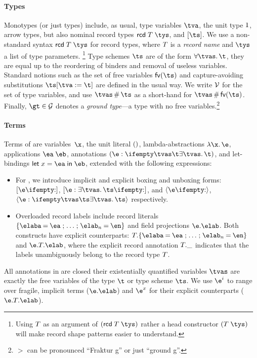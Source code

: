 \documentclass[acmsmall,screen,nonacm%
\Anonymous{,anonymous}{}%
\Final{}{,review}%
]{acmart}
\begin{document}
\paragraph{Types}

Monotypes (or just types) include, as usual, type variables $\tv$, the unit
type $1$, arrow types, but also nominal record types $\trcd \T \tys$, and
\polytypes $\tpoly \ts$. We use a non-standard syntax $\trcd \T \tys$ for record
types, where $T$ is a \emph{record name} and $\tys$ a list of type
parameters.%
%
\footnote{
  Using $T$ as an argument of $(\trcd \T \tys)$ rather a
  head constructor $(\Fapp[\T] \tys)$ will make record
  shape patterns easier to understand.
}
%
Type schemes $\ts$ are of the form $\all \tvs \t$, they are equal up to the
reordering of binders and removal of useless variables. Standard notions such
as the set of free variables $\fvs \ts$ and capture-avoiding substitutions
$\ts\where{\tv \is \t}$ are defined in the usual way. We write $\mathcal{V}$ for
the set of type variables, and use $\tvs \disjoint \ts$ as a short-hand for
$\tvs \disjoint \fvs \ts$. Finally, $\gt \in \Ground$ denotes a \emph{ground
type}---a type with no free variables.\footnote{$\gt$ can be pronounced
``Fraktur g'' or just ``ground g''.}


\paragraph{Terms}

Terms of \OML are variables~$\x$, the unit literal $()$,
lambda-abstractions $\efun \x \e$, applications $\eapp \ea \eb$, annotations
$\eannot \e \tvs \t$, and let-bindings $\elet x \ea \eb$, extended with the
following expressions:
\begin{itemize}

\item
  For \polytypes, we introduce implicit and explicit boxing and unboxing
  forms: $\epoly \e$, $\expoly \e \tvs \ts$, and $\einst \e$, $\exinst \e
  \tvs \ts$ respectively.

\item
  Overloaded record labels include record literals $\erecord { \elaba = \ea;
  \ldots; \elab_n = \en }$ and field projections $\efield \e \elab$. Both
  constructs have explicit counterparts: $\exrecord \T {\elaba = \ea;
  \ldots; \elab_n = \en }$ and $\exfield \e \T \elab$, where the explicit
    record annotation $T . \_$ indicates that the labels unambiguously
  belong to the record type $T$.

\end{itemize}
All annotations in \OML are closed \ie their existentially quantified
variables $\tvs$ are exactly the free variables of the type $\t$ or type
scheme $\ts$.
%
We use $\e^i$ to range over fragile, implicit terms (\eg $\efield \e \elab$) and
$\e^x$ for their explicit counterparts (\eg $\exfield \e \T \elab$).
\end{document}
